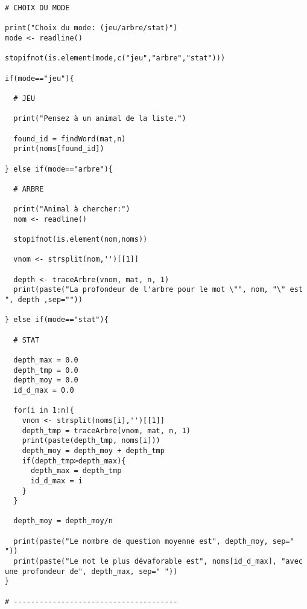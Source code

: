 \documentclass[a4paper,11pt]{article}
\begin{document}
\begin{lstlisting}[caption=Ensemble des fonctions du TP]
# CHOIX DU MODE

print("Choix du mode: (jeu/arbre/stat)")
mode <- readline()

stopifnot(is.element(mode,c("jeu","arbre","stat")))

if(mode=="jeu"){
  
  # JEU
  
  print("Pensez à un animal de la liste.")
  
  found_id = findWord(mat,n)
  print(noms[found_id])
  
} else if(mode=="arbre"){
  
  # ARBRE
  
  print("Animal à chercher:")
  nom <- readline()
  
  stopifnot(is.element(nom,noms))
  
  vnom <- strsplit(nom,'')[[1]]
  
  depth <- traceArbre(vnom, mat, n, 1)
  print(paste("La profondeur de l'arbre pour le mot \"", nom, "\" est ", depth ,sep=""))
  
} else if(mode=="stat"){
  
  # STAT
  
  depth_max = 0.0
  depth_tmp = 0.0
  depth_moy = 0.0
  id_d_max = 0.0
  
  for(i in 1:n){
    vnom <- strsplit(noms[i],'')[[1]]
    depth_tmp = traceArbre(vnom, mat, n, 1)
    print(paste(depth_tmp, noms[i]))
    depth_moy = depth_moy + depth_tmp
    if(depth_tmp>depth_max){
      depth_max = depth_tmp
      id_d_max = i
    }
  }
  
  depth_moy = depth_moy/n
  
  print(paste("Le nombre de question moyenne est", depth_moy, sep=" "))
  print(paste("Le not le plus dévaforable est", noms[id_d_max], "avec une profondeur de", depth_max, sep=" "))
}

# --------------------------------------

  \end{lstlisting}
\end{document}
